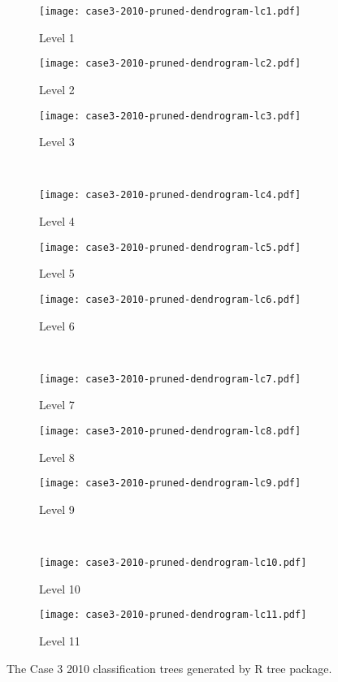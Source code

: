 \begin{appendices}

\begin{figure}[!ht] \centering
	\captionsetup[subfigure]{width=2.0in}
	\begin{subfigure}[t]{0.32\textwidth}
		\texttt{[image: case3-2010-pruned-dendrogram-lc1.pdf]}
		\caption{Level 1}
	\end{subfigure}
	\begin{subfigure}[t]{0.32\textwidth}
		\texttt{[image: case3-2010-pruned-dendrogram-lc2.pdf]}
		\caption{Level 2}
	\end{subfigure}
	\begin{subfigure}[t]{0.32\textwidth}
		\texttt{[image: case3-2010-pruned-dendrogram-lc3.pdf]}
		\caption{Level 3}
	\end{subfigure}\\
	\vspace{5pt}
	\begin{subfigure}[t]{0.32\textwidth}
		\texttt{[image: case3-2010-pruned-dendrogram-lc4.pdf]}
		\caption{Level 4}
	\end{subfigure}
	\begin{subfigure}[t]{0.32\textwidth}
		\texttt{[image: case3-2010-pruned-dendrogram-lc5.pdf]}
		\caption{Level 5}
	\end{subfigure}
	\begin{subfigure}[t]{0.32\textwidth}
		\texttt{[image: case3-2010-pruned-dendrogram-lc6.pdf]}
		\caption{Level 6}
	\end{subfigure}\\
	\vspace{5pt}	
	\begin{subfigure}[t]{0.32\textwidth}
		\texttt{[image: case3-2010-pruned-dendrogram-lc7.pdf]}
		\caption{Level 7}
	\end{subfigure}
	\begin{subfigure}[t]{0.32\textwidth}
		\texttt{[image: case3-2010-pruned-dendrogram-lc8.pdf]}
		\caption{Level 8}
	\end{subfigure}
	\begin{subfigure}[t]{0.32\textwidth}
		\texttt{[image: case3-2010-pruned-dendrogram-lc9.pdf]}
		\caption{Level 9}
	\end{subfigure}\\
	\vspace{5pt}
	\begin{subfigure}[t]{0.32\textwidth}
		\texttt{[image: case3-2010-pruned-dendrogram-lc10.pdf]}
		\caption{Level 10}
	\end{subfigure}
	\begin{subfigure}[t]{0.32\textwidth}
		\texttt{[image: case3-2010-pruned-dendrogram-lc11.pdf]}
		\caption{Level 11}
	\end{subfigure}
	\vspace{5pt}
	\caption[The Case 3 2010 classification trees generated by R tree package.]{The Case 3 2010 classification trees generated by R tree package.}
	\label{fig: appendix-fig.c23.tree}
\end{figure}


\end{appendices}
